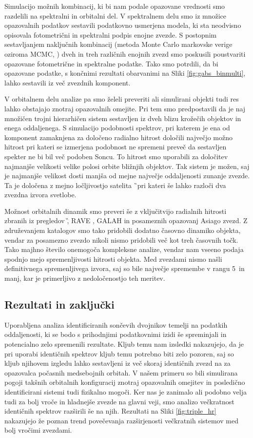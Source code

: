 Simulacijo možnih kombinacij, ki bi nam podale opazovane vrednosti smo razdelili na spektralni in orbitalni del. V spektralnem delu smo iz množice opazovalnih podatkov sestavili podatkovno usmerjena modela, ki sta neodvisno opisovala fotometrični in spektralni podpis enojne zvezde. S postopnim sestavljanjem naključnih kombinacij (metoda Monte Carlo markovske verige oziroma MCMC, \cite{2013PASP..125..306F}) dveh in treh različnih enojnih zvezd smo poskusili poustvariti opazovane fotometrične in spektralne podatke. Tako smo potrdili, da bi opazovane podatke, s končnimi rezultati obarvanimi na Sliki \ref{fig:gabs_binmulti}, lahko sestavili iz več zvezdnih komponent.

V orbitalnem delu analize pa smo želeli preveriti ali simulirani objekti tudi res lahko obstajajo znotraj opazovalnih omejite. Pri tem smo predpostavili da je naj množičen trojni hierarhičen sistem sestavljen iz dveh blizu krožečih objektov in enega oddaljenega. S simulacijo podobnosti spektrov, pri katerem je ena od komponent zamaknjena za določeno radialno hitrost določili največjo možno hitrost pri kateri se izmerjena podobnost ne spremeni preveč da sestavljen spekter ne bi bil več podoben Soncu. To hitrost smo uporabili za določitev najmanjše velikosti velike polosi orbite bližnjih objektov. Tak sistem je možen, saj je najmanjše velikost dosti manjša od mejne največje oddaljenosti zunanje zvezde. Ta je določena z mejno ločljivostjo satelita \G\ pri kateri še lahko razloči dva zvezdna izvora svetlobe.

Možnost orbitalnih dinamik smo preveri še z vključitvijo radialnih hitrosti zbranih iz pregledov \G, RAVE \cite{2017AJ....153...75K}, GALAH in posameznih opazovanj Asiago zvezd. Z združevanjem katalogov smo tako pridobili dodatno časovno dinamiko objekta, vendar za posamezno zvezdo nikoli nismo pridobili več kot treh časovnih točk. Tako majhno število onemogoča kompleksne analize, vendar nam vseeno podaja spodnjo mejo spremenljivosti hitrosti objekta. Med zvezdami nismo našli definitivnega spremenljivega izvora, saj so bile največje spremembe v rangu 5~\kms in manj, kar je primerljivo z nedoločenostjo teh meritev.

\subsection{Rezultati in zaključki}
Uporabljena analiza identificiranih sončevih dvojnikov temelji na podatkih oddaljenosti, ki se bodo s prihodnjimi podatkovnimi izidi še spreminjali in potencialno zelo spremenili rezultate. Kljub temu nam izsledki nakazujejo, da je pri uporabi identičnih spektrov kljub temu potrebno biti zelo pozoren, saj so kljub njihovem izgledu lahko sestavljeni iz več skoraj identičnih zvezd na za opazovalca počasnih medsebojnih orbitah. V našem primeru so bili simulirana pogoji takšnih orbitalnih konfiguracij znotraj opazovalnih omejitev in posledično identificirani sistemi tudi fizikalno mogoči. Ker nas je zanimalo ali podobno velja tudi za bolj vroče in hladnejše zvezde na glavni veji, smo analizo večkratnost identičnih spektrov razširili še na njih. Rezultati na Sliki \ref{fig:triple_hr} nakazujejo že poznan trend \cite{2013ARA&A..51..269D} povečevanja razširjenosti večkratnih sistemov med bolj vročimi zvezdami.

